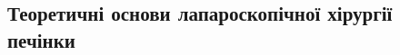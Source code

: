 \begin{refsection}
\chapter{Теоретичні основи лапароскопічної хірургії печінки}

  
% 
% 
% 
% 


\printbibliography[heading=subbibliography] 

\end{refsection}